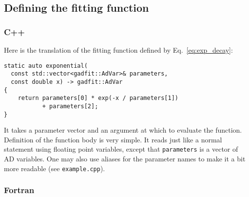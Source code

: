 \documentclass{article}
\begin{document}
\subsection{Defining the fitting function}

\subsubsection{\label{sec:fit_function_cxx}C++}

Here is the translation of the fitting function defined by Eq.~\eqref{eq:exp_decay}:
\begin{verbatim}
static auto exponential(
  const std::vector<gadfit::AdVar>& parameters,
  const double x) -> gadfit::AdVar
{
    return parameters[0] * exp(-x / parameters[1])
           + parameters[2];
}
\end{verbatim}
It takes a parameter vector and an argument at which to evaluate the function. Definition of the function body is very simple. It reads just like a normal statement using floating point variables, except that \texttt{parameters} is a vector of AD variables. One may also use aliases for the parameter names to make it a bit more readable (see \texttt{example.cpp}).

\subsubsection{Fortran}
\end{document}
